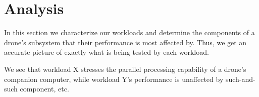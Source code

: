 \section{Analysis}

In this section we characterize our workloads and determine the components of a drone's subsystem that their performance is most affected by. Thus, we get an accurate picture of exactly what is being tested by each workload.

We see that workload X stresses the parallel processing capability of a drone's companion computer, while workload Y's performance is unaffected by such-and-such component, etc.
